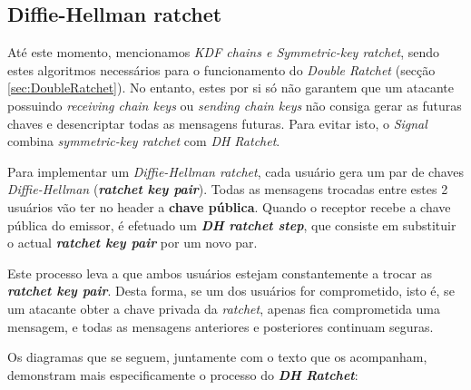 \subsection{Diffie-Hellman ratchet}\label{sec:dhratchet}
Até este momento, mencionamos \textit{KDF chains e Symmetric-key ratchet}, sendo estes algoritmos necessários para o funcionamento do \textit{Double Ratchet} (secção \ref{sec:DoubleRatchet}). No entanto, estes por si só não garantem que um atacante possuindo \textit{receiving chain keys} ou \textit{sending chain keys} não consiga gerar as futuras chaves e desencriptar todas as mensagens futuras. Para evitar isto, o \textit{Signal} combina \textit{symmetric-key ratchet} com \textit{DH Ratchet}.

Para implementar um \textit{Diffie-Hellman ratchet}, cada usuário gera um par de chaves \textit{Diffie-Hellman} (\textit{\textbf{ratchet key pair}}). Todas as mensagens trocadas entre estes 2 usuários vão ter no header a \textbf{chave pública}. Quando o receptor recebe a chave pública do emissor, é efetuado um \textbf{\textit{DH ratchet step}}, que consiste em substituir o actual \textbf{\textit{ratchet key pair}} por um novo par.

Este processo leva a que ambos usuários estejam constantemente a trocar as \textbf{\textit{ratchet key pair}}. Desta forma, se um dos usuários for comprometido, isto é, se um atacante obter a chave privada da \textit{ratchet}, apenas fica comprometida uma mensagem, e todas as mensagens anteriores e posteriores continuam seguras.

Os diagramas que se seguem, juntamente com o texto que os acompanham, demonstram mais especificamente o processo do \textbf{\textit{DH Ratchet}}:

